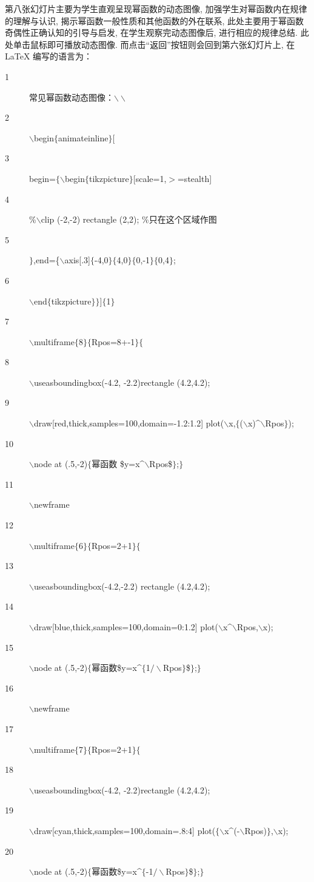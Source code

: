 第八张幻灯片主要为学生直观呈现幂函数的动态图像, 加强学生对幂函数内在规律的理解与认识, 揭示幂函数一般性质和其他函数的外在联系, 此处主要用于幂函数奇偶性正确认知的引导与启发, 在学生观察完动态图像后, 进行相应的规律总结. 此处单击鼠标即可播放动态图像. 而点击“返回”按钮则会回到第六张幻灯片上, 在\LaTeX{} 编写的语言为：
\begin{description}
	\item[1] 常见幂函数动态图像：$\backslash\backslash$
	\item[2]$\backslash$begin$\{$animateinline$\}$[
	\item[3]  begin=$\{\backslash$begin$\{$tikzpicture$\}$[scale=1,$>$=stealth]
	\item[4]  \%$\backslash$clip (-2,-2) rectangle (2,2); \%只在这个区域作图
	\item[5] $\}$,end=\{$\backslash$axis[.3]$\{$-4,0$\}\{$4,0$\}\{$0,-1$\}\{$0,4$\}$;
	\item[6] $\backslash$end$\{$tikzpicture$\}\}$]$\{$1$\}$
	\item[7] $\backslash$multiframe$\{$8$\}\{$Rpos=8+-1$\}\{$
	\item[8] $\backslash$useasboundingbox(-4.2, -2.2)rectangle (4.2,4.2);
	\item[9] $\backslash$draw[red,thick,samples=100,domain=-1.2:1.2]
	plot($\backslash$x,$\{$($\backslash$x)\^{}$\backslash$Rpos$\}$);
	\item[10] $\backslash$node at (.5,-2)$\{$幂函数
	\$y=x\^{}$\backslash$Rpos\$$\}$;$\}$
	\item[11] $\backslash$newframe
	\item[12] $\backslash$multiframe$\{$6$\}\{$Rpos=2+1$\}\{$
	\item[13] $\backslash$useasboundingbox(-4.2,-2.2) rectangle (4.2,4.2);
	\item[14] $\backslash$draw[blue,thick,samples=100,domain=0:1.2]
	plot($\backslash$x\^{}$\backslash$Rpos,$\backslash$x);
	\item[15] $\backslash$node at (.5,-2)$\{$幂函数\$y=x\^{}$\{$1$/\backslash$Rpos$\}$\$$\}$;$\}$
	\item[16] $\backslash$newframe
	\item[17] $\backslash$multiframe$\{$7$\}\{$Rpos=2+1$\}\{$
	\item[18] $\backslash$useasboundingbox(-4.2, -2.2)rectangle (4.2,4.2);
	\item[19] $\backslash$draw[cyan,thick,samples=100,domain=.8:4]
	plot($\{\backslash$x\^{}(-$\backslash$Rpos)$\}$,$\backslash$x);
	\item[20] $\backslash$node at (.5,-2)$\{$幂函数\$y=x\^{}$\{$-1$/\backslash$Rpos$\}$\$$\}$;$\}$

\end{description}
